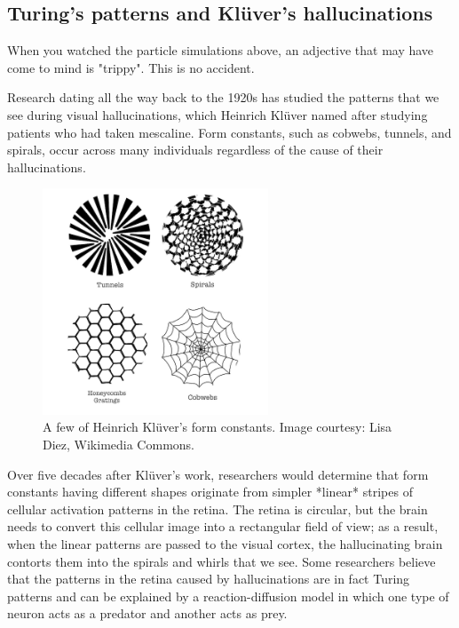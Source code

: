 {\FloatBarrier
{}
\subsection{Turing's patterns and Klüver's hallucinations}

When you watched the particle simulations above, an adjective that may have come to mind is "trippy". This is no accident.

Research dating all the way back to the 1920s has studied the patterns that we see during visual hallucinations, which Heinrich Klüver named  after studying patients who had taken mescaline. Form constants, such as cobwebs, tunnels, and spirals, occur across many individuals regardless of the cause of their hallucinations.

\begin{figure}[h]
\centering
\mySfFamily
\includegraphics[width = 0.6\textwidth]{../assets/images/600px/form_constants.png}
\caption{A few of Heinrich Klüver's form constants. Image courtesy: Lisa Diez, Wikimedia Commons.}
\label{fig:form_constants}
\end{figure}

Over five decades after Klüver's work, researchers would determine that form constants having different shapes originate from simpler *linear* stripes of cellular activation patterns in the retina. The retina is circular, but the brain needs to convert this cellular image into a rectangular field of view; as a result, when the linear patterns are passed to the visual cortex, the hallucinating brain contorts them into the spirals and whirls that we see. Some researchers believe that the patterns in the retina caused by hallucinations are in fact Turing patterns and can be explained by a reaction-diffusion model in which one type of neuron acts as a predator and another acts as prey.

}
